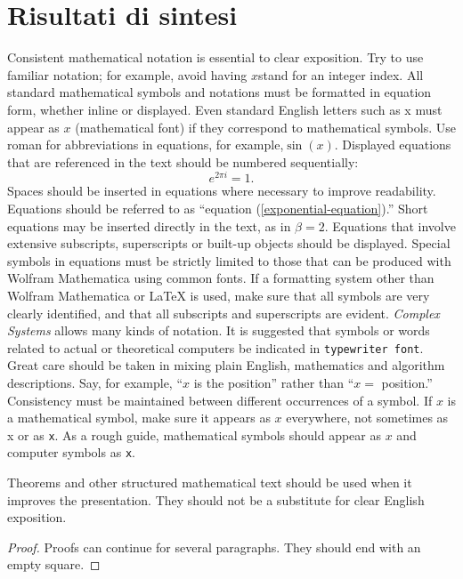 \documentclass{article}
\begin{document}
\section{Risultati di sintesi}
Consistent mathematical notation is essential to clear exposition. Try to use familiar notation; for example, avoid having \(x\)stand for an integer index.
All standard mathematical symbols and notations must be formatted in equation form, whether inline or displayed. Even standard English letters such as x must appear as \(x\) (mathematical font) if they correspond to mathematical symbols. Use roman for abbreviations in equations, for example,\(\sin (x)\).
%
Displayed equations that are referenced in the text should be numbered sequentially: 
\begin{equation}
e^{2\pi i}=1.
\label{exponential-equation}
\end{equation}
Spaces should be inserted in equations where necessary to improve readability. Equations should be referred to as {``}equation (\ref{exponential-equation}).{''} Short equations may be inserted directly in the text, as in \(\beta =2\). Equations that involve extensive subscripts, superscripts or built-up objects should be displayed. Special symbols in equations must be strictly limited to those that can be produced with Wolfram Mathematica using common fonts.
If a formatting system other than Wolfram Mathematica or LaTeX is used, make sure that all symbols are very clearly identified, and that all subscripts and superscripts are evident. \textit{Complex Systems} allows many kinds of notation. It is suggested that symbols or words related to actual or theoretical computers be indicated in \texttt{typewriter font}. 
Great care should be taken in mixing plain English, mathematics and algorithm descriptions. Say, for example, {``}\(x\) is the position{''} rather than {``}\(x=\) position.{''} Consistency must be maintained between different occurrences of a symbol. If \(x\) is a mathematical symbol, make sure it appears as \(x\) everywhere, not sometimes as x or as \texttt{x}. As a rough guide, mathematical symbols should appear as \(x\) and computer symbols as \texttt{x}. 
\begin{theorem}
Theorems and other structured mathematical text should be used when it improves the presentation. They should not be a substitute for clear English exposition. 
\end{theorem}
\begin{proof}
Proofs can continue for several paragraphs. They should end with an empty square.
\end{proof}
\end{document}
